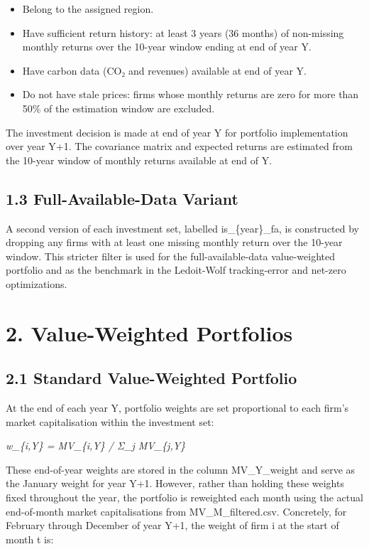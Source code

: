 \documentclass[
  11pt,
]{article}
\begin{document}
\begin{itemize}
\item
  Belong to the assigned region.
\item
  Have sufficient return history: at least 3 years (36 months) of
  non-missing monthly returns over the 10-year window ending at end of
  year Y.
\item
  Have carbon data (CO₂ and revenues) available at end of year Y.
\item
  Do not have stale prices: firms whose monthly returns are zero for
  more than 50\% of the estimation window are excluded.
\end{itemize}

The investment decision is made at end of year Y for portfolio
implementation over year Y+1. The covariance matrix and expected returns
are estimated from the 10-year window of monthly returns available at
end of Y.

\hypertarget{full-available-data-variant}{%
\subsection{1.3 Full-Available-Data
Variant}\label{full-available-data-variant}}

A second version of each investment set, labelled is\_\{year\}\_fa, is
constructed by dropping any firms with at least one missing monthly
return over the 10-year window. This stricter filter is used for the
full-available-data value-weighted portfolio and as the benchmark in the
Ledoit-Wolf tracking-error and net-zero optimizations.

\hypertarget{value-weighted-portfolios}{%
\section{2. Value-Weighted Portfolios}\label{value-weighted-portfolios}}

\hypertarget{standard-value-weighted-portfolio}{%
\subsection{2.1 Standard Value-Weighted
Portfolio}\label{standard-value-weighted-portfolio}}

At the end of each year Y, portfolio weights are set proportional to
each firm's market capitalisation within the investment set:

\emph{w\_\{i,Y\} = MV\_\{i,Y\} / Σ\_j MV\_\{j,Y\}}

These end-of-year weights are stored in the column MV\_Y\_weight and
serve as the January weight for year Y+1. However, rather than holding
these weights fixed throughout the year, the portfolio is reweighted
each month using the actual end-of-month market capitalisations from
MV\_M\_filtered.csv. Concretely, for February through December of year
Y+1, the weight of firm i at the start of month t is:
\end{document}
